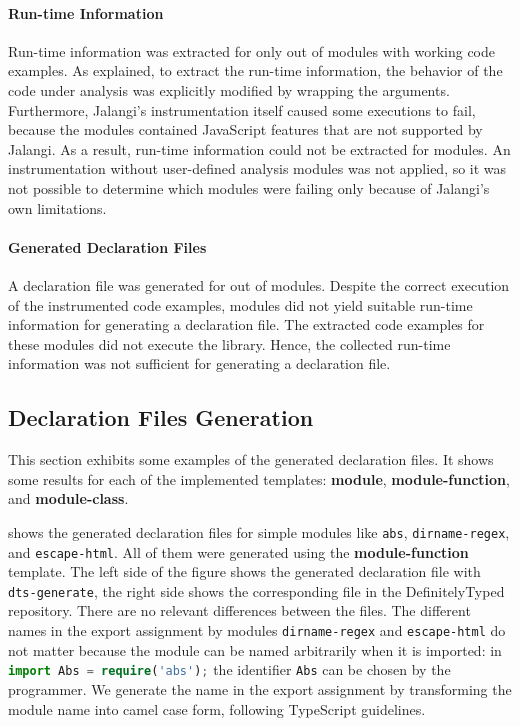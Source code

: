 \documentclass[sigconf]{acmart}
\begin{document}
\paragraph*{Run-time Information}
Run-time information was extracted for only \CountModulesRunTimeInfoExtracted{} out of \CountModulesWorkingCodeExamples{} modules with working code
examples. As explained, to extract the run-time information, the behavior of the code
under analysis was explicitly modified by wrapping the arguments. Furthermore, Jalangi's
instrumentation itself caused some executions to fail, because the modules contained
JavaScript features that are not supported by Jalangi. As a result, run-time information
could not be extracted for \CountModulesRunTimeInfoCouldNotBeExtracted{} modules. An instrumentation without user-defined analysis
modules was not applied, so it was not possible to determine which modules were failing
only because of Jalangi's own limitations. 

\paragraph*{Generated Declaration Files}
A declaration file was generated for \CountModulesGeneratedDeclarationFile{} out of \CountModulesRunTimeInfoExtracted{} modules. Despite the correct execution
of the instrumented code examples, \CountModulesDeclarationFileCouldNotBeGenerated{} modules did not yield suitable run-time information
for generating a declaration file. The extracted code examples for these modules did not
execute the library. Hence, the collected run-time information was not sufficient
for generating a declaration file. 

\subsection{Declaration Files Generation}
\label{sec:experiments-declaration-files-generation}

This section exhibits some examples of the \CountModulesGeneratedDeclarationFile{} generated
declaration files. It shows some results for each of the implemented
templates: \textbf{module}, \textbf{module-function}, and
\textbf{module-class}. 

 shows the generated
declaration files for simple modules like \texttt{abs},
\texttt{dirname-regex}, and \texttt{escape-html}. All of them were
generated using the \textbf{module-function} template. The left side of the figure shows
the generated declaration file with 
\lstinline{dts-generate}, the right side shows the corresponding file
in the DefinitelyTyped repository. 
There are no relevant differences between the files. 
The different names in the export assignment by modules \texttt{dirname-regex} and
\texttt{escape-html} do not matter because the module can be named arbitrarily when it is imported: in
\lstinline[language=TypeScript]/import Abs = require('abs');/ the
identifier \lstinline[language=TypeScript]/Abs/ can be chosen by the
programmer. We generate the name in the export 
assignment by transforming the module name into camel case form, following TypeScript
guidelines.
\end{document}
